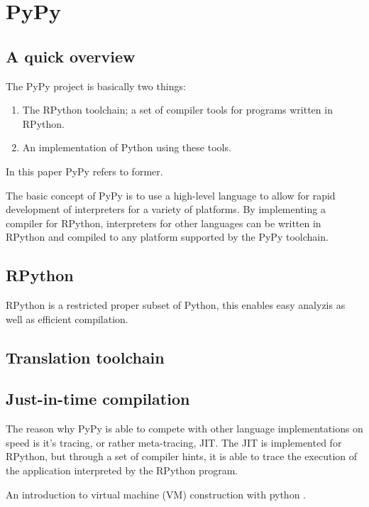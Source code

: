 \section{PyPy}

\subsection{A quick overview}

The PyPy project is basically two things:

\begin{enumerate}

\item The RPython toolchain; a set of compiler tools for programs written in 
RPython.

\item An implementation of Python using these tools.

\end{enumerate}

In this paper PyPy refers to former.

The basic concept of PyPy is to use a high-level language to allow for rapid
development of interpreters for a variety of platforms. By implementing a compiler
for RPython, interpreters for other languages can be written in RPython and 
compiled to any platform supported by the PyPy toolchain.

\subsection{RPython}

RPython is a restricted proper subset of Python, this enables easy analyzis 
as well as efficient compilation.

\subsection{Translation toolchain}


\subsection{Just-in-time compilation}

The reason why PyPy is able to compete with other language implementations
on speed is it's tracing, or rather meta-tracing, JIT. The JIT is implemented
for RPython, but through a set of compiler hints, it is able to trace the 
execution of the application interpreted by the RPython program.

An introduction to virtual machine (VM) construction with python \cite{pypy}.

